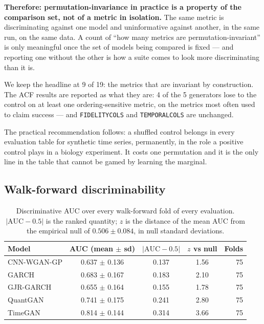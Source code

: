 \documentclass[11pt,a4paper]{article}
\makeatletter
\DeclareRobustCommand{\_}{\ifmmode\nfss@text{\textunderscore}\else\textunderscore\allowbreak\fi}
\makeatother
\begin{document}
\textbf{Therefore: permutation-invariance in practice is a property of the comparison set, not of a metric in isolation.} The same metric is discriminating against one model and uninformative against another, in the same run, on the same data. A count of ``how many metrics are permutation-invariant'' is only meaningful once the set of models being compared is fixed --- and reporting one without the other is how a suite comes to look more discriminating than it is.

We keep the headline at 9 of 19: the metrics that are invariant by construction. The ACF results are reported as what they are: 4 of the 5 generators lose to the control on at least one ordering-sensitive metric, on the metrics most often used to claim success --- and \texttt{FIDELITY\_COLS} and \texttt{TEMPORAL\_COLS} are unchanged.

The practical recommendation follows: a shuffled control belongs in every evaluation table for synthetic time series, permanently, in the role a positive control plays in a biology experiment. It costs one permutation and it is the only line in the table that cannot be gamed by learning the marginal.

\subsection{Walk-forward discriminability}
\label{sec:walkforward}

\begin{table}[htbp]
\centering
\caption{Discriminative AUC over every walk-forward fold of every evaluation. $|\mathrm{AUC}-0.5|$ is the ranked quantity; $z$ is the distance of the mean AUC from the empirical null of $0.506\pm0.084$, in null standard deviations.}
\label{tab:auc}
\begin{tabular}{@{}lcccr@{}}
\toprule
Model & AUC (mean $\pm$ sd) & $|\mathrm{AUC}-0.5|$ & $z$ vs null & Folds \\
\midrule
CNN-WGAN-GP & 0.637 $\pm$ 0.136 & 0.137 & 1.56 & 75 \\
GARCH & 0.683 $\pm$ 0.167 & 0.183 & 2.10 & 75 \\
GJR-GARCH & 0.655 $\pm$ 0.164 & 0.155 & 1.78 & 75 \\
QuantGAN & 0.741 $\pm$ 0.175 & 0.241 & 2.80 & 75 \\
TimeGAN & 0.814 $\pm$ 0.144 & 0.314 & 3.66 & 75 \\
\bottomrule
\end{tabular}
\end{table}
\end{document}
